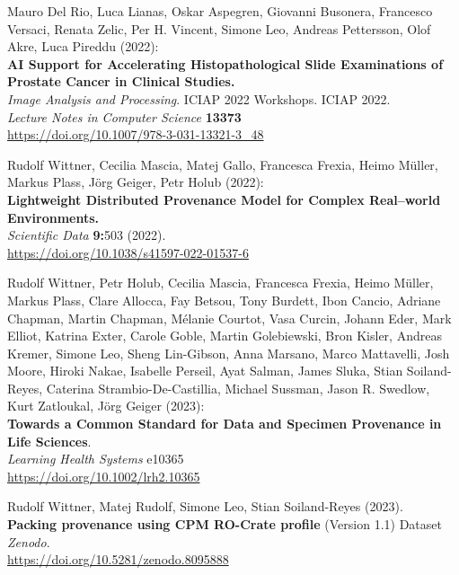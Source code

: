 \documentclass[10pt,letterpaper]{article}
\begin{document}
\begin{thebibliography}{10}
\begin{small}
Mauro Del Rio, Luca Lianas, Oskar Aspegren, Giovanni Busonera, Francesco Versaci, Renata Zelic, Per H. Vincent, Simone Leo, Andreas Pettersson, Olof Akre, Luca Pireddu (2022):\\
\textbf{AI Support for Accelerating Histopathological Slide Examinations of Prostate Cancer in Clinical Studies.}\\
\emph{Image Analysis and Processing}. ICIAP 2022 Workshops. ICIAP 2022. \\
\emph{Lecture Notes in Computer Science} \textbf{13373}\\
\url{https://doi.org/10.1007/978-3-031-13321-3_48}




Rudolf Wittner, Cecilia Mascia, Matej Gallo, Francesca Frexia, Heimo Müller, Markus Plass, Jörg Geiger, Petr Holub (2022):\\
\textbf{Lightweight Distributed Provenance Model for Complex Real--world
Environments.\\
}\emph{Scientific Data} \textbf{9:}503 (2022).\\
\url{https://doi.org/10.1038/s41597-022-01537-6}

Rudolf Wittner, Petr Holub, Cecilia Mascia, Francesca Frexia, Heimo Müller, Markus Plass, Clare Allocca, Fay Betsou, Tony Burdett, Ibon Cancio, Adriane Chapman, Martin Chapman, Mélanie Courtot, Vasa Curcin, Johann Eder, Mark Elliot, Katrina Exter, Carole Goble, Martin Golebiewski, Bron Kisler, Andreas Kremer, Simone Leo, Sheng Lin-Gibson, Anna Marsano, Marco Mattavelli, Josh Moore, Hiroki Nakae, Isabelle Perseil, Ayat Salman, James Sluka, Stian Soiland-Reyes, Caterina Strambio-De-Castillia, Michael Sussman, Jason R. Swedlow, Kurt Zatloukal, Jörg Geiger (2023):\\
\textbf{Towards a Common Standard for Data and Specimen Provenance in
Life Sciences}.\\
\emph{Learning Health Systems} e10365\\
\url{https://doi.org/10.1002/lrh2.10365}


 Rudolf Wittner, Matej Rudolf, Simone Leo, Stian Soiland-Reyes (2023).\\
\textbf{Packing provenance using CPM RO-Crate profile} (Version 1.1)
Dataset\\
\emph{Zenodo}.\\
\url{https://doi.org/10.5281/zenodo.8095888}




\end{small}
\end{thebibliography}
\end{document}
